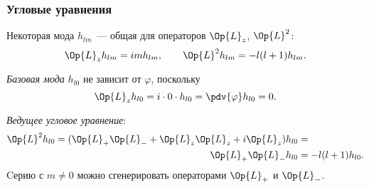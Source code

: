 \documentclass[compress]{beamer}
\begin{document}
    \begin{frame}\frametitle{Угловые уравнения}

        Некоторая мода $h_{lm}$~--- общая для операторов $\Op{L}_z$, $\Op{L}^2$:
        \begin{equation*}
            \Op{L}_z h_{lm} = im h_{lm}, \qquad
            \Op{L}^2 h_{lm} = -l(l+1) h_{lm}.
        \end{equation*}

        \textit{Базовая мода} $h_{l0}$ не зависит от $\varphi$, поскольку
        \begin{equation*}
            \Op{L}_z h_{l0} = i \cdot 0 \cdot h_{l0} = \pdv{\varphi} h_{l0} = 0.
        \end{equation*}

        \textit{Ведущее угловое уравнение}:
        \begin{equation}\begin{aligned}\label{eq:killeq-hl0}
                \Op{L}^2 h_{l0} = (\Op{L}_{+}\Op{L}_{-} + \Op{L}_z\Op{L}_z + i \Op{L}_z) h_{l0} &= \\\Op{L}_{+}\Op{L}_{-} h_{l0} &= - l(l+1) h_{l0}.
        \end{aligned}\end{equation}
        Cерию с $m \neq 0$ можно сгенерировать операторами $\Op{L}_{+}$ и $\Op{L}_{-}$.

    \end{frame}

\end{document}
